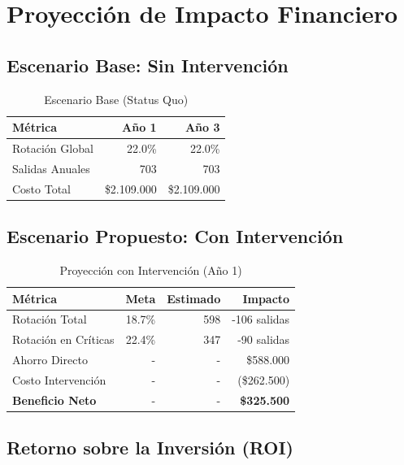 \documentclass[11pt,a4paper,twoside]{article}
\begin{document}
\section{Proyección de Impacto Financiero}

\subsection{Escenario Base: Sin Intervención}

\begin{table}[H]
    \centering
    \caption{Escenario Base (Status Quo)}
    \begin{tabular}{|l|r|r|}
        \toprule
        \textbf{Métrica} & \textbf{Año 1} & \textbf{Año 3} \\
        \midrule
        Rotación Global & 22.0\% & 22.0\% \\
        Salidas Anuales & 703 & 703 \\
        Costo Total & \$2.109.000 & \$2.109.000 \\
        \bottomrule
    \end{tabular}
\end{table}

\subsection{Escenario Propuesto: Con Intervención}

\begin{table}[H]
    \centering
    \caption{Proyección con Intervención (Año 1)}
    \begin{tabular}{|l|r|r|r|}
        \toprule
        \textbf{Métrica} & \textbf{Meta} & \textbf{Estimado} & \textbf{Impacto} \\
        \midrule
        Rotación Total & 18.7\% & 598 & -106 salidas \\
        Rotación en Críticas & 22.4\% & 347 & -90 salidas \\
        Ahorro Directo & - & - & \$588.000 \\
        Costo Intervención & - & - & (\$262.500) \\
        \midrule
        \textbf{Beneficio Neto} & - & - & \textbf{\$325.500} \\
        \bottomrule
    \end{tabular}
\end{table}

\subsection{Retorno sobre la Inversión (ROI)}
\end{document}
